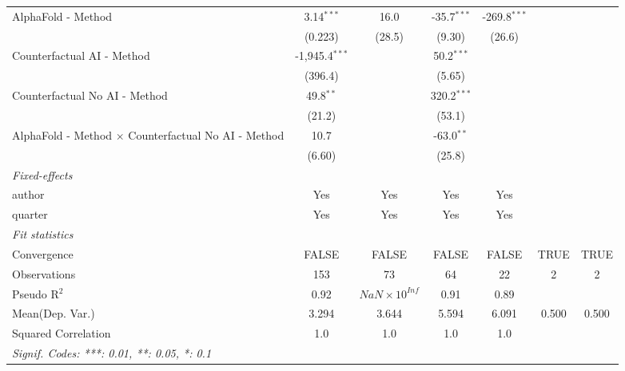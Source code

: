 \begin{tabular}{lcccccc}
   AlphaFold - Method                                         & 3.14$^{***}$     & 16.0                  & -35.7$^{***}$ & -269.8$^{***}$ &      &   \\   
                                                              & (0.223)          & (28.5)                & (9.30)        & (26.6)         &      &   \\   
   Counterfactual AI - Method                                 & -1,945.4$^{***}$ &                       & 50.2$^{***}$  &                &      &   \\   
                                                              & (396.4)          &                       & (5.65)        &                &      &   \\   
   Counterfactual No AI - Method                              & 49.8$^{**}$      &                       & 320.2$^{***}$ &                &      &   \\   
                                                              & (21.2)           &                       & (53.1)        &                &      &   \\   
   AlphaFold - Method $\times$ Counterfactual No AI - Method  & 10.7             &                       & -63.0$^{**}$  &                &      &   \\   
                                                              & (6.60)           &                       & (25.8)        &                &      &   \\   
   \midrule
   \emph{Fixed-effects}\\
   author                                                     & Yes              & Yes                   & Yes           & Yes            &      & \\  
   quarter                                                    & Yes              & Yes                   & Yes           & Yes            &      & \\  
   \midrule
   \emph{Fit statistics}\\
   Convergence                                                &FALSE             & FALSE                 & FALSE         & FALSE          & TRUE & TRUE\\  
   Observations                                               & 153              & 73                    & 64            & 22             & 2    & 2\\  
   Pseudo R$^2$                                               & 0.92             & $NaN\times 10^{Inf}$  & 0.91          & 0.89           &      & \\  
Mean(Dep. Var.) & 3.294 & 3.644 & 5.594 & 6.091 & 0.500 & 0.500 \\
   Squared Correlation                                        & 1.0              & 1.0                   & 1.0           & 1.0            &      & \\  
   \midrule \midrule
   \multicolumn{7}{l}{\emph{Signif. Codes: ***: 0.01, **: 0.05, *: 0.1}}\\
\end{tabular}
\par\endgroup
